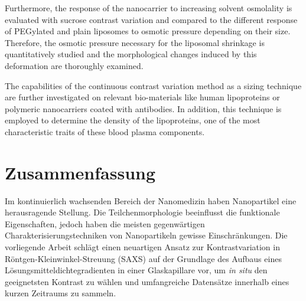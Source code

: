 Furthermore, the response of the nanocarrier to increasing solvent osmolality is evaluated with sucrose contrast variation and compared to the different response of PEGylated and plain liposomes to osmotic pressure depending on their size. Therefore, the osmotic pressure necessary for the liposomal shrinkage is quantitatively studied and the morphological changes induced by this deformation are thoroughly examined.


The capabilities of the continuous contrast variation method as a sizing technique  are further investigated on relevant bio-materials like human lipoproteins or polymeric nanocarriers coated with antibodies. In addition, this technique is employed to determine the density of the lipoproteins, one of the most characteristic traits of these blood plasma components.





\normalsize

\cleardoublepage

\thispagestyle{empty}

\chapter*{Zusammenfassung}



Im kontinuierlich wachsenden Bereich der Nanomedizin haben Nanopartikel eine herausragende Stellung. Die Teilchenmorphologie beeinflusst die funktionale Eigenschaften, jedoch haben die meisten gegenwärtigen Charakterisierungstechniken von Nanopartikeln gewisse Einschränkungen. Die vorliegende Arbeit schlägt einen neuartigen Ansatz zur Kontrastvariation in Röntgen-Kleinwinkel-Streuung (SAXS) auf der Grundlage des Aufbaus eines Lösungsmitteldichtegradienten in einer Glaskapillare vor, um \emph{in situ} den geeignetsten Kontrast zu wählen und umfangreiche Datensätze innerhalb eines kurzen Zeitraums zu sammeln.

